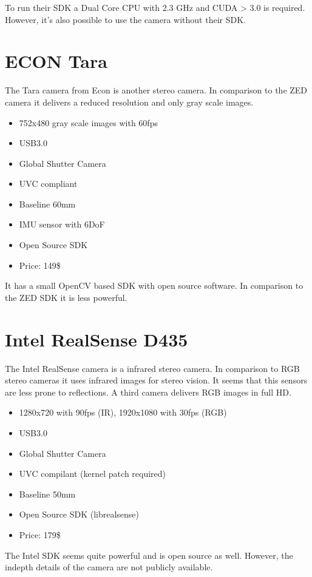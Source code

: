 \documentclass[11pt,a4paper,titlepage,oneside]{report}
\begin{document}
To run their SDK a Dual Core CPU with 2.3 GHz and CUDA > 3.0 is required. However, it's also possible to use the camera without their SDK.

\section{ECON Tara}
The Tara camera \cite{tara} from Econ is another stereo camera. In comparison to the ZED camera it delivers a reduced resolution and only gray scale images.
\begin{itemize}
  \item 752x480 gray scale images with 60fps
  \item USB3.0
  \item Global Shutter Camera
  \item UVC compliant
  \item Baseline 60mm
  \item IMU sensor with 6DoF
  \item Open Source SDK
  \item Price: 149\$
\end{itemize}

It has a small OpenCV based SDK with open source software. In comparison to the ZED SDK it is less powerful.

\section{Intel RealSense D435}
The Intel RealSense camera \cite{realsense} is a infrared stereo camera. In comparison to RGB stereo cameras it uses infrared images for stereo vision. It seems that this sensors are less prone to reflections. A third camera delivers RGB images in full HD.
\begin{itemize}
  \item 1280x720 with 90fps (IR), 1920x1080 with 30fps (RGB)
  \item USB3.0
  \item Global Shutter Camera
  \item UVC compilant (kernel patch required)
  \item Baseline 50mm
  \item Open Source SDK (librealsense)
  \item Price: 179\$
\end{itemize}

The Intel SDK seems quite powerful and is open source as well. However, the indepth details of the camera are not publicly available.
\end{document}
